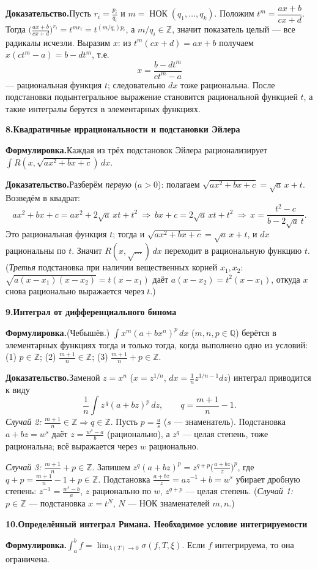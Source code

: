 \documentclass[10pt,a4paper]{article}
\newcommand{\Z}{\mathbb{Z}}
\newcommand{\Q}{\mathbb{Q}}
\newcommand{\dx}{\,dx}
\theoremstyle{definition}
\theoremstyle{plain}
\newcommand{\writespace}{\vspace{7.5mm}}
\newcommand{\prf}[2]{%
  \par\writespace\noindent
  {\large\bfseries\color{accent}#1.\enspace #2}\par\smallskip}
\newcommand{\stmt}{\par\noindent\textbf{Формулировка.}\enspace}
\newcommand{\dok}{\par\noindent\textbf{Доказательство.}\enspace}
\begin{document}
\dok Пусть $r_i=\tfrac{p_i}{q_i}$ и $m=\operatorname{НОК}(q_1,\dots,q_k)$. Положим
$t^m=\dfrac{ax+b}{cx+d}$. Тогда
$\bigl(\tfrac{ax+b}{cx+d}\bigr)^{r_i}=t^{m r_i}=t^{(m/q_i)p_i}$, а $m/q_i\in\Z$, значит показатель
целый — все радикалы исчезли. Выразим $x$: из $t^m(cx+d)=ax+b$ получаем $x(ct^m-a)=b-dt^m$, т.е.
\[
  x=\frac{b-dt^m}{ct^m-a}
\]
— рациональная функция $t$; следовательно $dx$ тоже рациональна. После подстановки подынтегральное
выражение становится рациональной функцией $t$, а такие интегралы берутся в элементарных функциях.

\prf{8}{Квадратичные иррациональности и подстановки Эйлера}
\stmt Каждая из трёх подстановок Эйлера рационализирует $\int R(x,\sqrt{ax^2+bx+c})\dx$.

\dok Разберём \emph{первую} ($a>0$): полагаем $\sqrt{ax^2+bx+c}=\sqrt a\,x+t$. Возведём в квадрат:
\[
  ax^2+bx+c=ax^2+2\sqrt a\,xt+t^2\ \Rightarrow\ bx+c=2\sqrt a\,xt+t^2\ \Rightarrow\
  x=\frac{t^2-c}{b-2\sqrt a\,t}.
\]
Это рациональная функция $t$; тогда и $\sqrt{ax^2+bx+c}=\sqrt a\,x+t$, и $dx$ рациональны по $t$.
Значит $R(x,\sqrt{\dots})\dx$ переходит в рациональную функцию $t$. (\emph{Третья} подстановка при
наличии вещественных корней $x_1,x_2$: $\sqrt{a(x-x_1)(x-x_2)}=t(x-x_1)$ даёт
$a(x-x_2)=t^2(x-x_1)$, откуда $x$ снова рационально выражается через $t$.)

\prf{9}{Интеграл от дифференциального бинома}
\stmt (Чебышёв.) $\int x^m(a+bx^n)^p\dx$ ($m,n,p\in\Q$) берётся в элементарных функциях тогда и
только тогда, когда выполнено одно из условий: (1) $p\in\Z$; (2) $\tfrac{m+1}{n}\in\Z$; (3)
$\tfrac{m+1}{n}+p\in\Z$.

\dok Заменой $z=x^n$ ($x=z^{1/n}$, $dx=\tfrac1n z^{1/n-1}dz$) интеграл приводится к виду
\[
  \frac1n\int z^{\,q}(a+bz)^p\,dz,\qquad q=\frac{m+1}{n}-1 .
\]
\emph{Случай 2:} $\tfrac{m+1}{n}\in\Z\Rightarrow q\in\Z$. Пусть $p=\tfrac us$ ($s$ — знаменатель).
Подстановка $a+bz=w^s$ даёт $z=\tfrac{w^s-a}{b}$ (рационально), а $z^{q}$ — целая степень, тоже
рациональна; всё выражается через $w$ рационально.

\emph{Случай 3:} $\tfrac{m+1}{n}+p\in\Z$. Запишем
$z^{q}(a+bz)^p=z^{q+p}\bigl(\tfrac{a+bz}{z}\bigr)^p$, где $q+p=\tfrac{m+1}{n}-1+p\in\Z$. Подстановка
$\tfrac{a+bz}{z}=az^{-1}+b=w^s$ убирает дробную степень: $z^{-1}=\tfrac{w^s-b}{a}$, $z$ рационально
по $w$, $z^{q+p}$ — целая степень. (\emph{Случай 1:} $p\in\Z$ — подстановка $x=t^N$, $N$ — НОК
знаменателей $m,n$.)

\prf{10}{Определённый интеграл Римана. Необходимое условие интегрируемости}
\stmt $\displaystyle\int_a^b f=\lim_{\lambda(T)\to0}\sigma(f,T,\xi)$. Если $f$ интегрируема, то она
ограничена.
\end{document}
